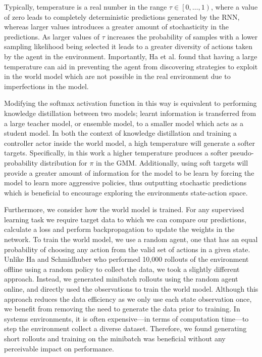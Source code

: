 Typically, temperature is a real number in the range $\tau \in \left[ 0, \ldots, 1 \right)$, where a value of zero leads to completely deterministic predictions generated by the RNN, whereas larger values introduces a greater amount of stochasticity in the predictions. As larger values of $\tau$ increases the probability of samples with a lower sampling likelihood being selected it leads to a greater diversity of actions taken by the agent in the environment. Importantly, Ha et al. \cite{ha2018worldmodels} found that having a large temperature can aid in preventing the agent from discovering strategies to exploit in the world model which are not possible in the real environment due to imperfections in the model.

Modifying the softmax activation function in this way is equivalent to performing knowledge distillation between two models; learnt information is transferred from a large teacher model, or ensemble model, to a smaller model which acts as a student model. In both the context of knowledge distillation and training a controller actor inside the world model, a high temperature will generate a softer targets. Specifically, in this work a higher temperature produces a softer pseudo-probability distribution for $\pi$ in the GMM. Additionally, using soft targets will provide a greater amount of information for the model to be learn by forcing the model to learn more aggressive policies, thus outputting stochastic predictions which is beneficial to encourage exploring the environments state-action space.

Furthermore, we consider how the world model is trained. For any supervised learning task we require target data to which we can compare our predictions, calculate a loss and perform backpropagation to update the weights in the network. To train the world model, we use a random agent, one that has an equal probability of choosing any action from the valid set of actions in a given state. Unlike Ha and Schmidhuber \cite{ha2018worldmodels} who performed 10,000 rollouts of the environment offline using a random policy to collect the data, we took a slightly different approach. Instead, we generated minibatch rollouts using the random agent online, and directly used the observations to train the world model. Although this approach reduces the data efficiency as we only use each state observation once, we benefit from removing the need to generate the data prior to training. In systems environments, it is often expensive---in terms of computation time---to step the environment collect a diverse dataset. Therefore, we found generating short rollouts and training on the minibatch was beneficial without any perceivable impact on performance.

